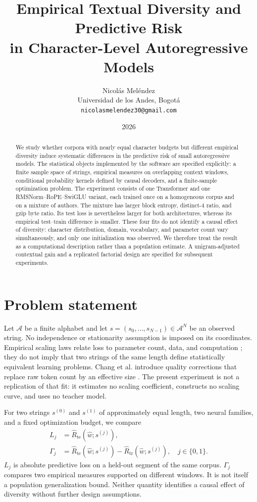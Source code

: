 \documentclass[11pt]{article}
\title{\bfseries Empirical Textual Diversity and Predictive Risk\\in Character-Level Autoregressive Models}
\author{Nicolás Meléndez\\Universidad de los Andes, Bogotá\\\texttt{nicolasmelendez30@gmail.com}}
\date{2026}
\newcommand{\A}{\mathcal A}
\newcommand{\1}{\mathbf 1}
\begin{document}
\maketitle

\begin{abstract}
We study whether corpora with nearly equal character budgets but different
empirical diversity induce systematic differences in the predictive risk of
small autoregressive models. The statistical objects implemented by the
software are specified explicitly: a finite sample space of strings, empirical
measures on overlapping context windows, conditional probability kernels
defined by causal decoders, and a finite-sample optimization problem. The
experiment consists of one Transformer and one RMSNorm--RoPE--SwiGLU variant,
each trained once on a homogeneous corpus and on a mixture of authors. The
mixture has larger block entropy, distinct-$4$ ratio, and gzip byte ratio. Its
test loss is nevertheless larger for both architectures, whereas its empirical
test--train difference is smaller. These four fits do not identify a causal
effect of diversity: character distribution, domain, vocabulary, and parameter
count vary simultaneously, and only one initialization was observed. We
therefore treat the result as a computational description rather than a
population estimate. A unigram-adjusted contextual gain and a replicated
factorial design are specified for subsequent experiments.
\end{abstract}

\section{Problem statement}

Let $\A$ be a finite alphabet and let
$s=(s_0,\ldots,s_{N-1})\in\A^N$ be an observed string. No independence or
stationarity assumption is imposed on its coordinates. Empirical scaling laws
relate loss to parameter count, data, and computation
\cite{kaplan-2020-scaling,hoffmann-2022-chinchilla}; they do not imply that two
strings of the same length define statistically equivalent learning problems.
Chang et al. introduce quality corrections that replace raw token count by an
effective size \cite{chang-etal-2024-scaling}. The present experiment is not a
replication of that fit: it estimates no scaling coefficient, constructs no
scaling curve, and uses no teacher model.

For two strings $s^{(0)}$ and $s^{(1)}$ of approximately equal length, two
neural families, and a fixed optimization budget, we compare
\begin{align}
 L_j&=\widehat R_{\mathrm{te}}(\widehat w;s^{(j)}),\label{eq:test-risk}\\
 \Gamma_j&=\widehat R_{\mathrm{te}}(\widehat w;s^{(j)})-
 \widehat R_{\mathrm{tr}}(\widehat w;s^{(j)}),\quad j\in\{0,1\}.
 \label{eq:gap}
\end{align}
$L_j$ is absolute predictive loss on a held-out segment of the same corpus.
$\Gamma_j$ compares two empirical measures supported on different windows. It
is not itself a population generalization bound. Neither quantity identifies a
causal effect of diversity without further design assumptions.
\end{document}
